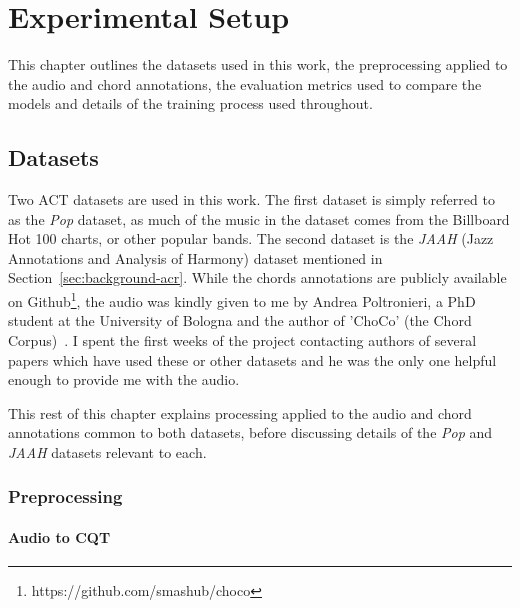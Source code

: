 \chapter{Experimental Setup}

This chapter outlines the datasets used in this work, the preprocessing applied to the audio and chord annotations, the evaluation metrics used to compare the models and details of the training process used throughout.

\section{Datasets}

Two ACT datasets are used in this work. The first dataset is simply referred to as the \emph{Pop} dataset, as much of the music in the dataset comes from the Billboard Hot 100 charts, or other popular bands. The second dataset is the \emph{JAAH} (Jazz Annotations and Analysis of Harmony) dataset mentioned in Section~\ref{sec:background-acr}. While the chords annotations are publicly available on Github\footnote{https://github.com/smashub/choco}, the audio was kindly given to me by Andrea Poltronieri, a PhD student at the University of Bologna and the author of 'ChoCo' (the Chord Corpus)~\citep{Choco}. I spent the first weeks of the project contacting authors of several papers which have used these or other datasets and he was the only one helpful enough to provide me with the audio.

This rest of this chapter explains processing applied to the audio and chord annotations common to both datasets, before discussing details of the \emph{Pop} and \emph{JAAH} datasets relevant to each.

\subsection{Preprocessing}

\subsubsection{Audio to CQT}\label{sec:audio-to-cqt}

